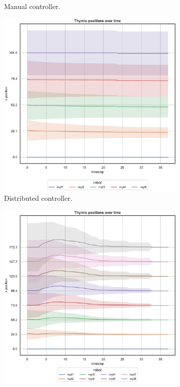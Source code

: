 \begin{figure}[!htb]
\begin{center}
\begin{subfigure}[h]{0.325\textwidth}
			\caption{Manual controller.}
		\end{subfigure}
		\hfill
		\begin{subfigure}[h]{0.325\textwidth}
			\centering
			\includegraphics[width=\textwidth]{contents/images/net-d18/N5/position-overtime-distributed}
			\caption{Distributed controller.}
		\end{subfigure}
	\end{center}
	\begin{center}
		\begin{subfigure}[h]{0.325\textwidth}
			\centering
			\includegraphics[width=\textwidth]{contents/images/net-d18/N8/position-overtime-omniscient}%

\end{subfigure}
\end{center}
\end{figure}

